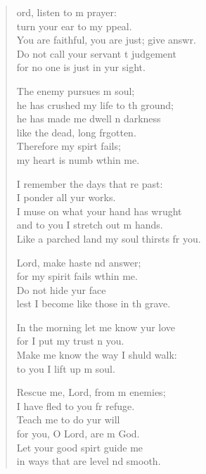\begin{verse}
  \begin{patverse}
    ord, listen to m prayer:\Med\\
    turn your ear to my ppeal.\\
    You are faithful, you are just; give answr.\Flex\\
    Do not call your servant t judgement\Med\\
    for no one is just in yur sight.

    The enemy pursues m soul;\Med\\
    he has crushed my life to th ground;\\
    he has made me dwell \pointup{\i}n darkness\Med\\
    like the dead, long frgotten.\\
    Therefore my spir\pointup{\i}t fails;\Med\\
    my heart is numb w\pointup{\i}thin me.

    I remember the days that re past:\Med\\
    I ponder all yur works.\\
    I muse on what your hand has wrught\Flex\\
    and to you I stretch out m hands.\Med\\
    Like a parched land my soul thirsts fr you.

    Lord, make haste nd answer;\Med\\
    for my spirit fails w\pointup{\i}thin me.\\
    Do not hide yur face\Med\\
    lest I become like those in th grave.

    In the morning let me know yur love\Med\\
    for I put my trust \pointup{\i}n you.\\
    Make me know the way I shuld walk:\Med\\
    to you I lift up m soul.

    Rescue me, Lord, from m enemies;\Med\\
    I have fled to you fr refuge.\\
    Teach me to do yur will\Med\\
    for you, O Lord, are m God.\\
    Let your good spir\pointup{\i}t guide me\Med\\
    in ways that are level nd smooth.


\end{patverse}
\end{verse}
